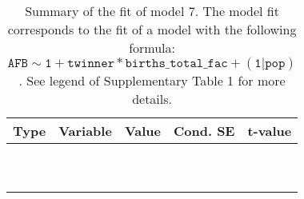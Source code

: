 \begin{table}[H]

\caption{\label{tab:tab7}Summary of the fit of model 7. The model fit corresponds to the fit of a model with the following formula: {\small$\mathtt{AFB \sim 1 + twinner * births\_total\_fac + (1 | pop)}$}. See legend of Supplementary Table 1 for more details.}
\centering
\fontsize{8}{10}\selectfont
\begin{tabular}[t]{>{\raggedright\arraybackslash}p{3cm}>{\raggedright\arraybackslash}p{5cm}rrr}
\toprule
Type & Variable & Value & Cond. SE & t-value\\
\midrule
\cellcolor{gray!6}{fixed effects} & \cellcolor{gray!6}{$\beta_1$} & \cellcolor{gray!6}{5.86} & \cellcolor{gray!6}{0.0123} & \cellcolor{gray!6}{479}\\
\cellcolor{gray!6}{} & \cellcolor{gray!6}{$\beta_{\mathtt{twinner}}$} & \cellcolor{gray!6}{0.0752} & \cellcolor{gray!6}{0.0207} & \cellcolor{gray!6}{3.63}\\
\cellcolor{gray!6}{} & \cellcolor{gray!6}{$\beta_{\mathtt{births\_total\_fac2}}$} & \cellcolor{gray!6}{-0.0396} & \cellcolor{gray!6}{0.00461} & \cellcolor{gray!6}{-8.6}\\
\cellcolor{gray!6}{} & \cellcolor{gray!6}{$\beta_{\mathtt{births\_total\_fac3}}$} & \cellcolor{gray!6}{-0.0686} & \cellcolor{gray!6}{0.00462} & \cellcolor{gray!6}{-14.8}\\
\cellcolor{gray!6}{} & \cellcolor{gray!6}{$\beta_{\mathtt{births\_total\_fac4}}$} & \cellcolor{gray!6}{-0.0977} & \cellcolor{gray!6}{0.00465} & \cellcolor{gray!6}{-21}\\
\cellcolor{gray!6}{} & \cellcolor{gray!6}{$\beta_{\mathtt{births\_total\_fac5}}$} & \cellcolor{gray!6}{-0.122} & \cellcolor{gray!6}{0.00477} & \cellcolor{gray!6}{-25.6}\\
\cellcolor{gray!6}{} & \cellcolor{gray!6}{$\beta_{\mathtt{births\_total\_fac6}}$} & \cellcolor{gray!6}{-0.156} & \cellcolor{gray!6}{0.00486} & \cellcolor{gray!6}{-32.1}\\
\cellcolor{gray!6}{} & \cellcolor{gray!6}{$\beta_{\mathtt{births\_total\_fac7}}$} & \cellcolor{gray!6}{-0.182} & \cellcolor{gray!6}{0.00513} & \cellcolor{gray!6}{-35.5}\\
\cellcolor{gray!6}{} & \cellcolor{gray!6}{$\beta_{\mathtt{births\_total\_fac8}}$} & \cellcolor{gray!6}{-0.217} & \cellcolor{gray!6}{0.00536} & \cellcolor{gray!6}{-40.5}\\
\cellcolor{gray!6}{} & \cellcolor{gray!6}{$\beta_{\mathtt{births\_total\_fac9}}$} & \cellcolor{gray!6}{-0.244} & \cellcolor{gray!6}{0.00601} & \cellcolor{gray!6}{-40.7}\\

\end{tabular}
\end{table}
